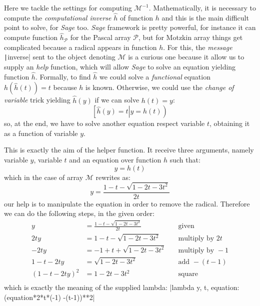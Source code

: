 Here we tackle the settings for computing $\mathcal{M}^{-1}$. Mathematically,
it is necessary to compute the \emph{computational inverse} $\hat{h}$ of
function $h$ and this is the main difficult point to solve, for \emph{Sage}
\cite{sage} too.  \emph{Sage} framework is pretty powerful, for instance it can
compute function $\hat{h}_{\mathcal{P}}$ for the Pascal array $\mathcal{P}$,
but for Motzkin array things get complicated because a radical appears in
function $h$. For this, the \emph{message} \texttt|inverse| sent to
the object denoting $\mathcal{M}$ is a curious one because it allow us to
supply an \emph{help} function, which will allow \emph{Sage} to solve an
equation yielding function $\hat{h}$. Formally, to find $\hat{h}$ we could
solve a \emph{functional} equation $h(\hat{h}(t))=t$ because $h$ is known.
Otherwise, we could use the \emph{change of variable} trick yielding
$\hat{h}(y)$ if we can solve $h(t)=y$: 
\begin{displaymath}
    \left.\left[\hat{h}(y)=t\right|y=h(t)\right)
\end{displaymath}
so, at the end, we have to solve another equation respect 
variable $t$, obtaining it as a function of variable $y$.

This is exactly the aim of the helper function. It receive three arguments, 
namely variable $y$, variable $t$ and an equation over function $h$ such that:
\begin{displaymath}
    y=h(t)
\end{displaymath}
which in the case of array $\mathcal{M}$ rewrites as:
\begin{displaymath}
    y=\frac{1-t-\sqrt{1-2t-3t^{2}}}{2t}
\end{displaymath}
our help is to manipulate the equation in order to remove the radical. Therefore
we can do the following steps, in the given order:
\begin{displaymath}
    \begin{split}
        y&=\frac{1-t-\sqrt{1-2t-3t^{2}}}{2t} &\quad\text{given}\\
        2ty &=1-t-\sqrt{1-2t-3t^{2}} &\quad\text{multiply by } 2t\\
        -2ty &=-1+t+\sqrt{1-2t-3t^{2}} &\quad\text{multiply by } -1\\
        1-t-2ty &=\sqrt{1-2t-3t^{2}} &\quad\text{add } -(t-1)\\
        \left(1-t-2ty\right)^{2} &=1-2t-3t^{2} &\quad\text{square}\\
    \end{split}
\end{displaymath}
which is exactly the meaning of the supplied lambda: |lambda y, t,
equation: (equation*2*t*(-1) -(t-1))**2| 


